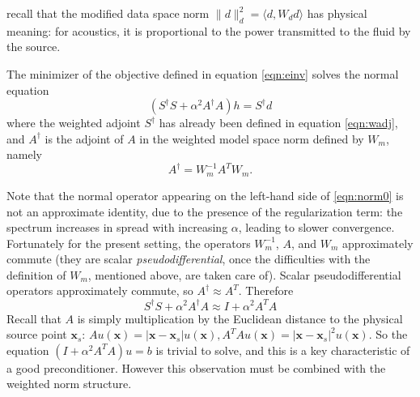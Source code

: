 \documentclass[georeport,12pt]{geophysics}
\newcommand{\bx}{\mathbf{x}}
\begin{document}
 recall that the modified data space norm $\|d\|_d^2 = \langle
d, W_d d\rangle$ has physical meaning: for acoustics, it is
proportional to the power transmitted to the fluid by the source.

The minimizer of the objective defined in equation \ref{eqn:einv}
solves the normal equation
\begin{equation}
  \label{eqn:norm0}
  (S^{\dagger}S + \alpha^2 A^{\dagger}A)h = S^{\dagger}d 
\end{equation}
where the weighted adjoint $S^{\dagger}$ has already been defined in equation \ref{eqn:wadj}, and $A^{\dagger}$ is the adjoint of $A$ in the weighted model space norm defined by $W_m$, namely
\begin{equation}
  \label{eqn:aadj}
  A^{\dagger} = W_m^{-1}A^TW_m.
\end{equation}

Note that the normal operator appearing on the left-hand side of
\ref{eqn:norm0} is not an approximate identity, due to the presence of
the regularization term: the spectrum increases in spread with
increasing $\alpha$, leading to slower convergence. Fortunately for
the present setting, the operators $W_m^{-1}$, $A$, and $W_m$
approximately commute (they are scalar {\em pseudodifferential}, once
the difficulties with the definition of $W_m$, mentioned above, are
taken care of). Scalar pseudodifferential operators approximately
commute, so $A^{\dagger} \approx A^T$. Therefore
\begin{equation}
  \label{eqn:normapprox}
  S^{\dagger}S + \alpha^2 A^{\dagger}A \approx I + \alpha^2A^TA
\end{equation}
Recall that $A$ is simply multiplication by the Euclidean distance to
the physical source point $\bx_s$: $A u (\bx) = |\bx-\bx_s|u(\bx),
A^TAu(\bx) = |\bx-\bx_s|^2u(\bx)$. So the equation $(I+\alpha^2
A^TA)u=b$ is trivial to solve, and this is a key characteristic of a
good preconditioner. However this observation must be combined with
the weighted norm structure.
\end{document}
